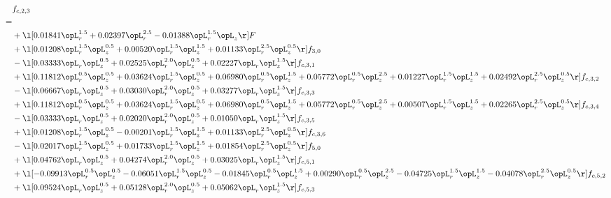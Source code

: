 \begin{alignat}{2} 
\label{eq:f_23_2} 
& f_{c,2,3} \nonumber \\ 
 = \\ 
& + \l[  0.01841 \opL_r^{1.5} +  0.02397 \opL_r^{2.5}   -0.01388 \opL_r^{1.5} \opL_z  \r] F \nonumber \\ 
& + \l[  0.01208 \opL_r^{1.5} \opL_z^{0.5} +  0.00520 \opL_r^{1.5} \opL_z^{1.5} +  0.01133 \opL_r^{2.5} \opL_z^{0.5}  \r] f_{3,0} \nonumber \\ 
& - \l[  0.03333 \opL_r \opL_z^{0.5} +  0.02525 \opL_r^{2.0} \opL_z^{0.5} +  0.02227 \opL_r \opL_z^{1.5}  \r] f_{c,3,1} \nonumber \\ 
& + \l[  0.11812 \opL_r^{0.5} \opL_z^{0.5} +  0.03624 \opL_r^{1.5} \opL_z^{0.5} +  0.06980 \opL_r^{0.5} \opL_z^{1.5} +  0.05772 \opL_r^{0.5} \opL_z^{2.5} +  0.01227 \opL_r^{1.5} \opL_z^{1.5} +  0.02492 \opL_r^{2.5} \opL_z^{0.5}  \r] f_{c,3,2} \nonumber \\ 
& - \l[  0.06667 \opL_r \opL_z^{0.5} +  0.03030 \opL_r^{2.0} \opL_z^{0.5} +  0.03277 \opL_r \opL_z^{1.5}  \r] f_{c,3,3} \nonumber \\ 
& + \l[  0.11812 \opL_r^{0.5} \opL_z^{0.5} +  0.03624 \opL_r^{1.5} \opL_z^{0.5} +  0.06980 \opL_r^{0.5} \opL_z^{1.5} +  0.05772 \opL_r^{0.5} \opL_z^{2.5} +  0.00507 \opL_r^{1.5} \opL_z^{1.5} +  0.02265 \opL_r^{2.5} \opL_z^{0.5}  \r] f_{c,3,4} \nonumber \\ 
& - \l[  0.03333 \opL_r \opL_z^{0.5} +  0.02020 \opL_r^{2.0} \opL_z^{0.5} +  0.01050 \opL_r \opL_z^{1.5}  \r] f_{c,3,5} \nonumber \\ 
& + \l[  0.01208 \opL_r^{1.5} \opL_z^{0.5}   -0.00201 \opL_r^{1.5} \opL_z^{1.5} +  0.01133 \opL_r^{2.5} \opL_z^{0.5}  \r] f_{c,3,6} \nonumber \\ 
& - \l[  0.02017 \opL_r^{1.5} \opL_z^{0.5} +  0.01733 \opL_r^{1.5} \opL_z^{1.5} +  0.01854 \opL_r^{2.5} \opL_z^{0.5}  \r] f_{5,0} \nonumber \\ 
& + \l[  0.04762 \opL_r \opL_z^{0.5} +  0.04274 \opL_r^{2.0} \opL_z^{0.5} +  0.03025 \opL_r \opL_z^{1.5}  \r] f_{c,5,1} \nonumber \\ 
& + \l[  -0.09913 \opL_r^{0.5} \opL_z^{0.5}   -0.06051 \opL_r^{1.5} \opL_z^{0.5}   -0.01845 \opL_r^{0.5} \opL_z^{1.5} +  0.00290 \opL_r^{0.5} \opL_z^{2.5}   -0.04725 \opL_r^{1.5} \opL_z^{1.5}   -0.04078 \opL_r^{2.5} \opL_z^{0.5}  \r] f_{c,5,2} \nonumber \\ 
& + \l[  0.09524 \opL_r \opL_z^{0.5} +  0.05128 \opL_r^{2.0} \opL_z^{0.5} +  0.05062 \opL_r \opL_z^{1.5}  \r] f_{c,5,3} \nonumber \\ 

\end{alignat}
